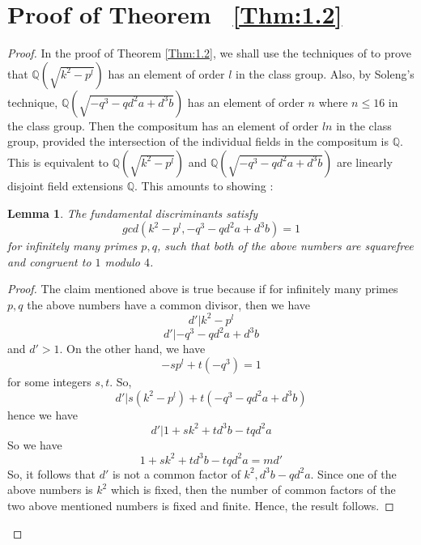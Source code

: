 \documentclass[12pt, 14paper]{amsart}
\theoremstyle{plain}
\newtheorem{lemma}[subsection]{Lemma}
\numberwithin{equation}{section}
\newcommand \QQ {{\mathbb Q}}
\begin{document}
\section{Proof of Theorem ~\texorpdfstring{\eqref{Thm:1.2}}{Thm:1.2}}
\begin{proof}
    

In the proof of Theorem \eqref{Thm:1.2}, we shall use the techniques of \cite{BH} to prove that $\QQ(\sqrt{k^2-p^l})$ has an element of order $l$ in the class group. Also, by Soleng's technique, $\QQ(\sqrt{-q^3-qd^2a+d^3b})$ has an element of order $n$ where $n\leq 16$ in the class group. Then the compositum has an element of order $ln$ in the class group, provided the intersection of the individual fields in the compositum is $\QQ$.  This is equivalent to $\QQ(\sqrt{k^2-p^l})$ and $ \QQ(\sqrt{-q^3-qd^2a+d^3b})$ are linearly disjoint field extensions $\QQ$. This amounts to showing :

\begin{lemma}The fundamental discriminants satisfy
$$gcd(k^2-p^l, -q^3-qd^2a+d^3b)=1$$ for infinitely many primes $p,q$, such that both of the above numbers are squarefree and congruent to $1$ modulo $4$.
\end{lemma}

\begin{proof}
The claim mentioned above is true  because if for infinitely many primes $p,q$ the above numbers have a common divisor, then we have 
$$d'|k^2-p^l$$
$$d'|-q^3-qd^2a+d^3b$$
and $d'>1$. 
On the other hand, we have $$ -sp^l + t (-q^3) = 1$$
for some integers $s,t$. So, 
$$d'|s(k^2-p^l)+t(-q^3-qd^2a+d^3b)$$
 hence we have 
$$d'|1+sk^2+td^3b-tqd^2a$$
So we have 
$$1+sk^2+td^3b-tqd^2a=md'$$
So, it follows that $d'$ is not a common factor of  $k^2, d^3b-qd^2a$. Since one of the above numbers is $k^2$ which is fixed, then the number of common factors of the two above mentioned numbers is fixed and finite. Hence, the result follows.


\end{proof}











\end{proof}
\end{document}
